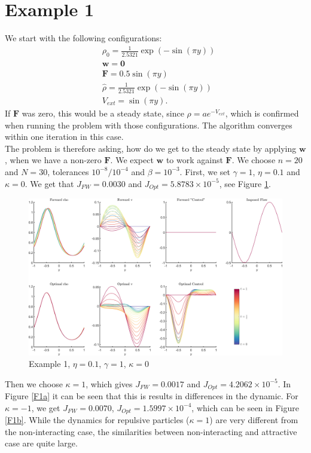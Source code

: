 \documentclass[11pt, a4paper]{article}
\theoremstyle{definition}
\newcommand{\w}{\mathbf{w}}
\begin{document}
	\section{Example 1}
	We start with the following configurations:
	\begin{align*}
	&\rho_0 = \frac{1}{2.5321}\exp(-\sin(\pi y))\\
	&\w = \mathbf{0}\\
	&\mathbf{F} = 0.5\sin(\pi y)\\
	&\widehat \rho = \frac{1}{2.5321}\exp(-\sin(\pi y))\\
	&V_{ext} =  \sin(\pi y).
	\end{align*}
	If $\mathbf{F}$ was zero, this would be a steady state, since $\rho = a e^{-V_{ext}}$, which is confirmed when running the problem with those configurations. The algorithm converges within one iteration in this case.\\
	The problem is therefore asking, how do we get to the steady state by applying $\w$, when we have a non-zero $\mathbf F$. We expect $\w$ to work against $\mathbf{F}$.
	We choose $n = 20$ and $N = 30$, tolerances $10^{-8}/10^{-4}$ and $\beta = 10^{-3}$. 
	First, we set $\gamma = 1$, $\eta = 0.1$ and $\kappa = 0$. We get that $J_{FW} = 0.0030$ and $J_{Opt} = 5.8783 \times 10^{-5}$, see Figure \ref{F1}.
	\begin{figure}[h]
		\centering
		\includegraphics[scale=0.04]{Example1.png}
		\caption{Example 1, $\eta = 0.1$, $\gamma = 1$, $\kappa = 0$} 
		\label{F1}
	\end{figure}
    Then we choose $\kappa = 1$, which gives $J_{FW} = 0.0017$ and $J_{Opt} = 4.2062 \times 10^{-5}$. In Figure \ref{F1a} it can be seen that this is results in differences in the dynamic. 
    For $\kappa = -1$, we get $J_{FW} = 0.0070$, $J_{Opt} = 1.5997 \times 10^{-4}$, which can be seen in Figure \ref{F1b}. While the dynamics for repulsive particles ($\kappa = 1$) are very different from the non-interacting case, the similarities between non-interacting and attractive case are quite large.
\end{document}
